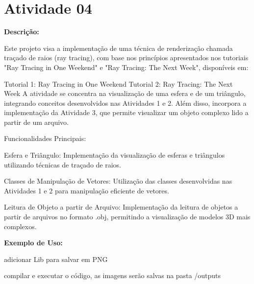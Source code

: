 \chapter{Atividade 04}
\hypertarget{index}{}\label{index}
\label{index_md__2_users_2renanoliveira_2_desktop_2ufscar_22023-02_2computacao-grafica_2atividades-projeto_2_atividade04_2_r_e_a_d_m_e}%
%
 {\bfseries{Descrição\+:}}

Este projeto visa a implementação de uma técnica de renderização chamada traçado de raios (ray tracing), com base nos princípios apresentados nos tutoriais "{}\+Ray Tracing in One Weekend"{} e "{}\+Ray Tracing\+: The Next Week"{}, disponíveis em\+:

Tutorial 1\+: Ray Tracing in One Weekend Tutorial 2\+: Ray Tracing\+: The Next Week A atividade se concentra na visualização de uma esfera e de um triângulo, integrando conceitos desenvolvidos nas Atividades 1 e 2. Além disso, incorpora a implementação da Atividade 3, que permite visualizar um objeto complexo lido a partir de um arquivo.

Funcionalidades Principais\+:

Esfera e Triângulo\+: Implementação da visualização de esferas e triângulos utilizando técnicas de traçado de raios.

Classes de Manipulação de Vetores\+: Utilização das classes desenvolvidas nas Atividades 1 e 2 para manipulação eficiente de vetores.

Leitura de Objeto a partir de Arquivo\+: Implementação da leitura de objetos a partir de arquivos no formato .obj, permitindo a visualização de modelos 3D mais complexos.

{\bfseries{Exemplo de Uso\+:}}


\begin{DoxyItemize}
\item adicionar Lib para salvar em PNG 
\begin{DoxyCode}{0}

\end{DoxyCode}

\item compilar e executar o código, as imagens serão salvas na pasta {\ttfamily /outputs} 
\begin{DoxyCode}{0}

\end{DoxyCode}
 
\end{DoxyItemize}